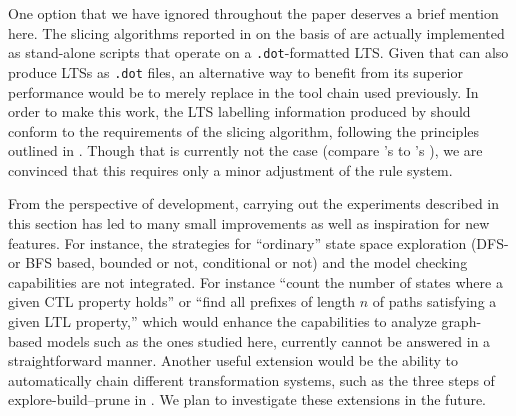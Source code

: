 \medskip\noindent One option that we have ignored throughout the paper deserves a brief mention here. The slicing algorithms reported in \cite{DBLP:conf/cmsb/BowlesBBFGM24,datamod2023} on the basis of \BioResolve are actually implemented as stand-alone scripts that operate on a \texttt{.dot}-formatted LTS. Given that \GROOVE can also produce LTSs as \texttt{.dot} files, an alternative way to benefit from its superior performance would be to merely replace \BioResolve in the tool chain used previously. In order to make this work, the LTS labelling information produced by \GROOVE should conform to the requirements of the slicing algorithm, following the principles outlined in . Though that is currently not the case (compare \GROOVE's  to \BioResolve's ), we are convinced that this requires only a minor adjustment of the rule system.

\medskip\noindent From the perspective of \GROOVE development, carrying out the experiments described in this section has led to many small improvements as well as inspiration for new features. For instance, the strategies for ``ordinary'' state space exploration (DFS- or BFS based, bounded or not, conditional or not) and the model checking capabilities are not integrated. For instance ``count the number of states where a given CTL property holds'' or ``find all prefixes of length $n$ of paths satisfying a given LTL property,'' which would enhance the capabilities to analyze graph-based models such as the ones studied here, currently cannot be answered in a straightforward manner. Another useful extension would be the ability to automatically chain different transformation systems, such as the three steps of explore-build--prune in . We plan to investigate these extensions in the future.
